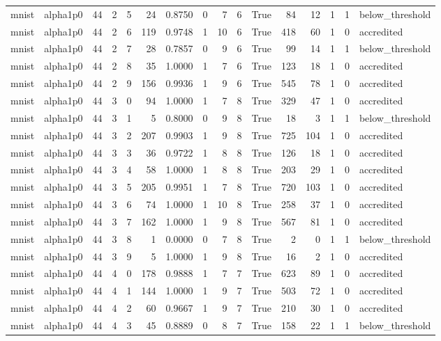 \begin{tabular}{llrrrrrrrrrrrrrl}
mnist & alpha1p0 & 44 & 2 & 5 & 24 & 0.8750 & 0 & 7 & 6 & True & 84 & 12 & 1 & 1 & below\_threshold \\
mnist & alpha1p0 & 44 & 2 & 6 & 119 & 0.9748 & 1 & 10 & 6 & True & 418 & 60 & 1 & 0 & accredited \\
mnist & alpha1p0 & 44 & 2 & 7 & 28 & 0.7857 & 0 & 9 & 6 & True & 99 & 14 & 1 & 1 & below\_threshold \\
mnist & alpha1p0 & 44 & 2 & 8 & 35 & 1.0000 & 1 & 7 & 6 & True & 123 & 18 & 1 & 0 & accredited \\
mnist & alpha1p0 & 44 & 2 & 9 & 156 & 0.9936 & 1 & 9 & 6 & True & 545 & 78 & 1 & 0 & accredited \\
mnist & alpha1p0 & 44 & 3 & 0 & 94 & 1.0000 & 1 & 7 & 8 & True & 329 & 47 & 1 & 0 & accredited \\
mnist & alpha1p0 & 44 & 3 & 1 & 5 & 0.8000 & 0 & 9 & 8 & True & 18 & 3 & 1 & 1 & below\_threshold \\
mnist & alpha1p0 & 44 & 3 & 2 & 207 & 0.9903 & 1 & 9 & 8 & True & 725 & 104 & 1 & 0 & accredited \\
mnist & alpha1p0 & 44 & 3 & 3 & 36 & 0.9722 & 1 & 8 & 8 & True & 126 & 18 & 1 & 0 & accredited \\
mnist & alpha1p0 & 44 & 3 & 4 & 58 & 1.0000 & 1 & 8 & 8 & True & 203 & 29 & 1 & 0 & accredited \\
mnist & alpha1p0 & 44 & 3 & 5 & 205 & 0.9951 & 1 & 7 & 8 & True & 720 & 103 & 1 & 0 & accredited \\
mnist & alpha1p0 & 44 & 3 & 6 & 74 & 1.0000 & 1 & 10 & 8 & True & 258 & 37 & 1 & 0 & accredited \\
mnist & alpha1p0 & 44 & 3 & 7 & 162 & 1.0000 & 1 & 9 & 8 & True & 567 & 81 & 1 & 0 & accredited \\
mnist & alpha1p0 & 44 & 3 & 8 & 1 & 0.0000 & 0 & 7 & 8 & True & 2 & 0 & 1 & 1 & below\_threshold \\
mnist & alpha1p0 & 44 & 3 & 9 & 5 & 1.0000 & 1 & 9 & 8 & True & 16 & 2 & 1 & 0 & accredited \\
mnist & alpha1p0 & 44 & 4 & 0 & 178 & 0.9888 & 1 & 7 & 7 & True & 623 & 89 & 1 & 0 & accredited \\
mnist & alpha1p0 & 44 & 4 & 1 & 144 & 1.0000 & 1 & 9 & 7 & True & 503 & 72 & 1 & 0 & accredited \\
mnist & alpha1p0 & 44 & 4 & 2 & 60 & 0.9667 & 1 & 9 & 7 & True & 210 & 30 & 1 & 0 & accredited \\
mnist & alpha1p0 & 44 & 4 & 3 & 45 & 0.8889 & 0 & 8 & 7 & True & 158 & 22 & 1 & 1 & below\_threshold \\

\end{tabular}
